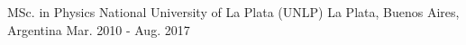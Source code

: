 

\begin{cventries}

  \cventry
    {MSc. in Physics} %
    {National University of La Plata (UNLP)} %
    {La Plata, Buenos Aires, Argentina} %
    {Mar. 2010 - Aug. 2017} %
    {
    }


\end{cventries}
